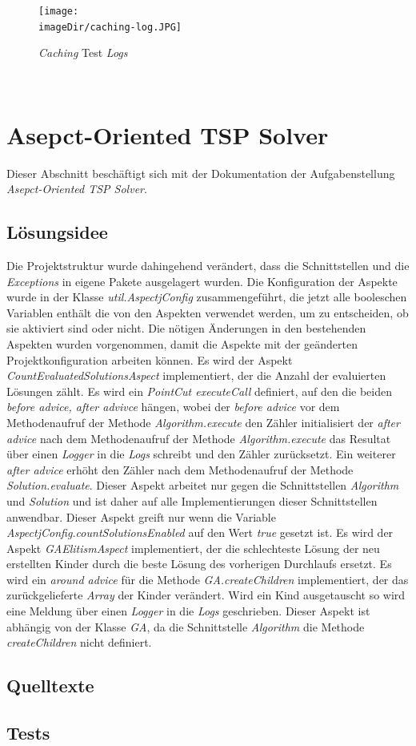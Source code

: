 \documentclass[11pt, a4paper, twoside]{article}   	%
\newcommand{\imageDir}{images}
\begin{document}
\begin{figure}[h]
	\centering
	\texttt{[image: \\imageDir/caching-log.JPG]}
	\caption{\emph{Caching} Test \emph{Logs}}
	\label{fig:caching-log}
\end{figure}
\ \newpage

\section{Asepct-Oriented TSP Solver}
Dieser Abschnitt beschäftigt sich mit der Dokumentation der Aufgabenstellung \emph{Asepct-Oriented TSP Solver}.
\subsection{Lösungsidee}
Die Projektstruktur wurde dahingehend verändert, dass die Schnittstellen und die \emph{Exceptions} in eigene Pakete ausgelagert wurden. Die Konfiguration der Aspekte wurde in der Klasse \emph{util.AspectjConfig} zusammengeführt, die jetzt alle booleschen Variablen enthält die von den Aspekten verwendet werden, um zu entscheiden, ob sie aktiviert sind oder nicht. Die nötigen Änderungen in den bestehenden Aspekten wurden vorgenommen, damit die Aspekte mit der geänderten Projektkonfiguration arbeiten können.
\newline
\newline
Es wird der Aspekt \emph{CountEvaluatedSolutionsAspect} implementiert, der die Anzahl der evaluierten Lösungen zählt. Es wird ein \emph{PointCut executeCall} definiert, auf den die beiden \emph{before advice, after advivce} hängen, wobei der \emph{before advice} vor dem Methodenaufruf der Methode \emph{Algorithm.execute} den Zähler initialisiert der \emph{after advice} nach dem Methodenaufruf der Methode \emph{Algorithm.execute} das Resultat über einen \emph{Logger} in die \emph{Logs} schreibt und den Zähler zurücksetzt. Ein weiterer \emph{after advice} erhöht den Zähler nach dem Methodenaufruf der Methode \emph{Solution.evaluate}. Dieser Aspekt arbeitet nur gegen die Schnittstellen \emph{Algorithm} und \emph{Solution} und ist daher auf alle Implementierungen dieser Schnittstellen anwendbar. Dieser Aspekt greift nur wenn die Variable \emph{AspectjConfig.countSolutionsEnabled} auf den Wert \emph{true} gesetzt ist.
\newline
\newline
Es wird der Aspekt \emph{GAElitismAspect} implementiert, der die schlechteste Lösung der neu erstellten Kinder durch die beste Lösung des vorherigen Durchlaufs ersetzt. Es wird ein \emph{around advice} für die Methode \emph{GA.createChildren} implementiert, der das zurückgelieferte \emph{Array} der Kinder verändert. Wird ein Kind ausgetauscht so wird eine Meldung über einen \emph{Logger} in die \emph{Logs} geschrieben. Dieser Aspekt ist abhängig von der Klasse \emph{GA}, da die Schnittstelle \emph{Algorithm} die Methode \emph{createChildren} nicht definiert.
\newline
\newline

 

\subsection{Quelltexte}
\subsection{Tests}
\end{document}
